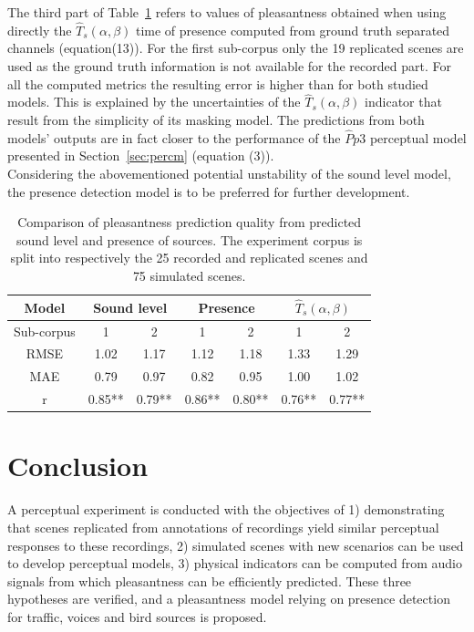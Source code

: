 \documentclass[11pt,a4paper]{article}
\begin{document}
The third part of Table~\ref{tab:pppred} refers to values of pleasantness obtained when using directly the $\hat T_s(\alpha, \beta)$ time of presence computed from ground truth separated channels (equation(13)). For the first sub-corpus only the 19 replicated scenes are used as the ground truth information is not available for the recorded part. For all the computed metrics the resulting error is higher than for both studied models. This is explained by the uncertainties of the $\hat T_s(\alpha, \beta)$ indicator that result from the simplicity of its masking model. The predictions from both models' outputs are in fact closer to the performance of the $\hat Pp3$ perceptual model presented in Section~\ref{sec:percm} (equation (3)).\\

Considering the abovementioned potential unstability of the sound level model, the presence detection model is to be preferred for further development.

\begin{table}[t]
\centering
\caption{Comparison of pleasantness prediction quality from predicted sound level and presence of sources. The experiment corpus is split into respectively the 25 recorded and replicated scenes and 75 simulated scenes.}
\label{tab:pppred}
\begin{tabular}{ c | c c | c c | c c }
\hline
	Model & \multicolumn{2}{|c}{Sound level} & \multicolumn{2}{|c}{Presence} & \multicolumn{2}{|c}{$\hat T_s(\alpha, \beta)$} \\ \hline
	Sub-corpus & 1 & 2 & 1 & 2 & 1 & 2 \\ \hline
	RMSE & 1.02 & 1.17 & 1.12 & 1.18 & 1.33 & 1.29 \\ 
	MAE & 0.79 & 0.97 & 0.82 & 0.95 & 1.00 & 1.02 \\ \hline
	r & 0.85** & 0.79** & 0.86** & 0.80** & 0.76** & 0.77** \\ \hline
\end{tabular}
\end{table}




\section{Conclusion}

A perceptual experiment is conducted with the objectives of 1) demonstrating that scenes replicated from annotations of recordings yield similar perceptual responses to these recordings, 2) simulated scenes with new scenarios can be used to develop perceptual models, 3) physical indicators can be computed from audio signals from which pleasantness can be efficiently predicted. These three hypotheses are verified, and a pleasantness model relying on presence detection for traffic, voices and bird sources is proposed.\\
\end{document}
